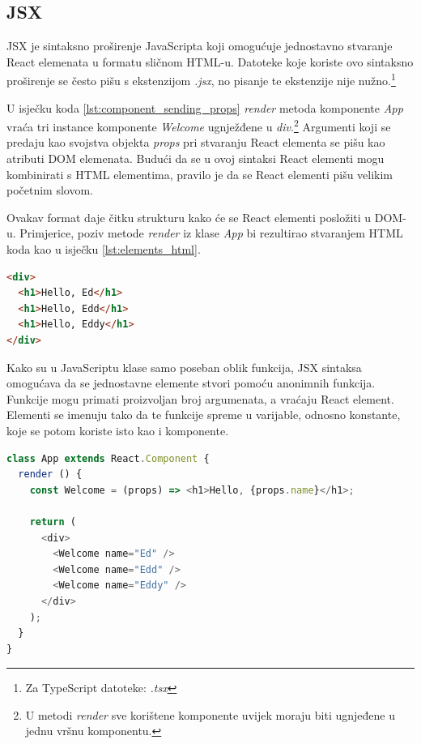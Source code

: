 \documentclass[times, utf8, zavrsni, numeric]{fer}
\newcommand{\razmakp}{\vspace{18pt}}
\newcommand{\razmaks}{\vspace{10pt}}
\begin{document}
\subsection{JSX} \label{sec:jsx}

JSX je sintaksno proširenje JavaScripta koji omogućuje jednostavno stvaranje React elemenata u formatu sličnom HTML-u.
Datoteke koje koriste ovo sintaksno proširenje se često pišu s ekstenzijom \glqq \emph{ .jsx}\grqq , no pisanje te ekstenzije nije nužno.\footnote{Za TypeScript datoteke: \glqq \emph{ .tsx}\grqq }

\razmakp

U isječku koda \ref{lst:component_sending_props} \emph{render} metoda komponente \emph{App} vraća tri instance komponente \emph{Welcome} ugnježđene u \emph{div}.\footnote{U metodi \emph{render} sve korištene komponente uvijek moraju biti ugnjeđene u jednu vršnu komponentu.}
Argumenti koji se predaju kao svojstva objekta \emph{props} pri stvaranju React elementa se pišu kao atributi DOM elemenata.
Budući da se u ovoj sintaksi React elementi mogu kombinirati s HTML elementima, pravilo je da se React elementi pišu velikim početnim slovom.\citep{reactDocsJSX}

Ovakav format daje čitku strukturu kako će se React elementi posložiti u DOM-u.
Primjerice, poziv metode \emph{render} iz klase \emph{App} bi rezultirao stvaranjem HTML koda kao u isječku \ref{lst:elements_html}.

\razmakp
\begin{lstlisting}[language=html, caption={Elementi isječka koda \ref{lst:component_sending_props} prikazani kao renderirani DOM elementi}, label={lst:elements_html}]
<div>
  <h1>Hello, Ed</h1>
  <h1>Hello, Edd</h1>
  <h1>Hello, Eddy</h1>
</div>
\end{lstlisting}
\razmaks

Kako su u JavaScriptu klase samo poseban oblik funkcija, JSX sintaksa omogućava da se jednostavne elemente stvori pomoću anonimnih funkcija.
Funkcije mogu primati proizvoljan broj argumenata, a vraćaju React element.
Elementi se imenuju tako da te funkcije spreme u varijable, odnosno konstante, koje se potom koriste isto kao i komponente.

\razmakp
\begin{lstlisting}[language=JavaScript, caption={Korištenje anonimne funkcije za stvaranje elementa}]
class App extends React.Component {
  render () {
    const Welcome = (props) => <h1>Hello, {props.name}</h1>;
    
    return (
      <div>
        <Welcome name="Ed" />
        <Welcome name="Edd" />
        <Welcome name="Eddy" />
      </div>
    );
  }
}
\end{lstlisting}
\razmaks
\end{document}
